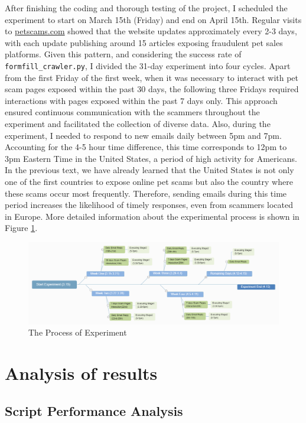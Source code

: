 \documentclass[ oneside,%
                    author={Cassie Qing Tang},
                    degree={BSc},
                     title={An Automated Response System for Disrupting Online Pet Scamming \\ },
                    subtitle={ }]{dissertation}
\begin{document}
After finishing the coding and thorough testing of the project, I scheduled the experiment to start on March 15th (Friday) and end on April 15th. Regular visits to \href{www.petscams.com}{petscams.com} showed that the website updates approximately every 2-3 days, with each update publishing around 15 articles exposing fraudulent pet sales platforms. Given this pattern, and considering the success rate of \texttt{formfill\_crawler.py}, I divided the 31-day experiment into four cycles. Apart from the first Friday of the first week, when it was necessary to interact with pet scam pages exposed within the past 30 days, the following three Fridays required interactions with pages exposed within the past 7 days only. This approach ensured continuous communication with the scammers throughout the experiment and facilitated the collection of diverse data. Also, during the experiment, I needed to respond to new emails daily between 5pm and 7pm. Accounting for the 4-5 hour time difference, this time corresponds to 12pm to 3pm Eastern Time in the United States, a period of high activity for Americans. In the previous text, we have already learned that the United States is not only one of the first countries to expose online pet scams but also the country where these scams occur most frequently. Therefore, sending emails during this time period increases the likelihood of timely responses, even from scammers located in Europe. More detailed information about the experimental process is shown in Figure \ref{fig:pic9}.
\begin{figure}[H]
\centering
\includegraphics[width=\linewidth]{pic/figure9.png}
\caption{The Process of Experiment}
\label{fig:pic9}
\end{figure}


\chapter{Analysis of results}
\section{Script Performance Analysis}
\end{document}
